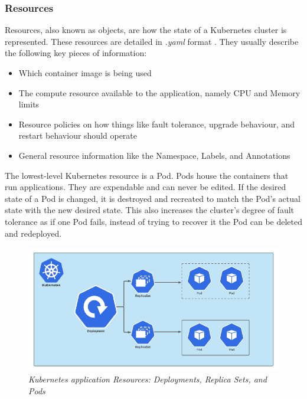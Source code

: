 \documentclass{article}
\begin{document}
\subsubsection{Resources} \label{resources}

Resources, also known as objects, are how the state of a Kubernetes cluster is represented. These resources are detailed in \emph{.yaml} format \cite{k8s-obj}. They usually describe the following key pieces of information:

\begin{itemize}
    \itemsep0em 
    \item Which container image is being used
    \item The compute resource available to the application, namely CPU and Memory limits
    \item Resource policies on how things like fault tolerance, upgrade behaviour, and restart behaviour should operate
    \item General resource information like the Namespace, Labels, and Annotations
\end{itemize}

The lowest-level Kubernetes resource is a Pod. Pods house the containers that run applications. They are expendable and can never be edited. If the desired state of a Pod is changed, it is destroyed and recreated to match the Pod's actual state with the new desired state. This also increases the cluster's degree of fault tolerance as if one Pod fails, instead of trying to recover it the Pod can be deleted and redeployed. 

\begin{figure}[H]
    \centering
    \includegraphics[width=160mm]{tech/resource-struct.png}
    \caption{\emph{Kubernetes application Resources: Deployments, Replica Sets, and Pods}}
    \label{resource-struct}
\end{figure}
\end{document}
